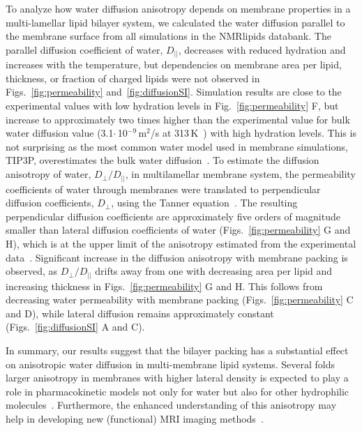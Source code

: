 \documentclass[fleqn,10pt]{wlscirep}
\begin{document}
To analyze how water diffusion anisotropy depends on membrane properties in a multi-lamellar lipid bilayer system, we calculated the water diffusion parallel to the membrane surface from all simulations in the NMRlipids databank. The parallel diffusion coefficient of water, $D_{||}$, decreases with reduced hydration and increases with the temperature, but dependencies on membrane area per lipid, thickness, or fraction of charged lipids were not observed in Figs.~\ref{fig:permeability} and~\ref{fig:diffusionSI}. Simulation results are close to the experimental values with low hydration levels in Fig.~\ref{fig:permeability} F, but increase to approximately two times higher than the experimental value for bulk water diffusion value (3.1$\cdot$\,10$^{-9}$\,m$^2$/s at 313\,K~\cite{khakimov08}) with high hydration levels. This is not surprising as the most common water model used in membrane simulations, TIP3P, overestimates the bulk water diffusion~\cite{pathirannahalage21}. To estimate the diffusion anisotropy of water, $D_\mathrm{\perp}/D_{||}$, in multilamellar membrane system, the permeability coefficients of water through membranes were translated to perpendicular diffusion coefficients, $D_\mathrm{\perp}$, using the Tanner equation~\cite{tanner78,wasterby02}. The resulting perpendicular diffusion coefficients are approximately five orders of magnitude smaller than lateral diffusion coefficients of water (Figs.~\ref{fig:permeability} G and H), which is at the upper limit of the anisotropy estimated from the experimental data~\cite{nitsche19}. 
Significant increase in the diffusion anisotropy with membrane packing is observed, as $D_\mathrm{\perp}/D_{||}$ drifts away from one with decreasing area per lipid and increasing thickness in Figs.~\ref{fig:permeability} G and H. This follows from decreasing water permeability with membrane packing (Figs.~\ref{fig:permeability} C and D), while lateral diffusion remains approximately constant (Figs.~\ref{fig:diffusionSI} A and C). 

In summary, our results suggest that the bilayer packing has a substantial effect on anisotropic water diffusion in multi-membrane lipid systems. Several folds larger anisotropy in membranes with higher lateral density is expected to play a role in pharmacokinetic models not only for water but also for other hydrophilic molecules~\cite{nitsche19}. Furthermore, the enhanced understanding of this anisotropy may help in developing new (functional) MRI imaging methods~\cite{topgaard20}.
\end{document}
